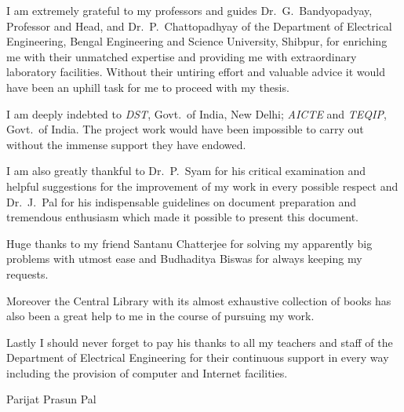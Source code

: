 \documentclass[a4paper,11pt]{report}
\begin{document}
\noindent I am extremely grateful to my professors and guides Dr.~G.~Bandyopadyay, Professor and Head, and Dr.~P.~Chattopadhyay of the Department of Electrical Engineering, Bengal Engineering and Science University, Shibpur, for enriching me with their unmatched expertise and providing me with extraordinary laboratory facilities. Without their untiring effort and valuable advice it would have been an uphill task for me to proceed with my thesis. 

I am deeply indebted to \emph{DST}, Govt.~of India, New Delhi; \emph{AICTE} and \emph{TEQIP}, Govt.~of India. The project work would have been impossible to carry out without the immense support they have endowed. 

I am also greatly thankful to Dr.~P.~Syam for his critical examination and helpful suggestions for the improvement of my work in every possible respect and Dr.~J.~Pal for his indispensable guidelines on document preparation and tremendous enthusiasm which made it possible to present this document.

Huge thanks to my friend Santanu Chatterjee for solving my apparently big problems with utmost ease and Budhaditya Biswas for always keeping my requests.

Moreover the Central Library with its almost exhaustive collection of books has also been a great help to me in the course of pursuing my work. 

Lastly I should never forget to pay his thanks to all my teachers and staff of the Department of Electrical Engineering for their continuous support in every way including the provision of computer and Internet facilities.

\vspace{25mm}
\hspace*{100mm} Parijat Prasun Pal

\tableofcontents

\listoffigures

\listoftables
\end{document}
